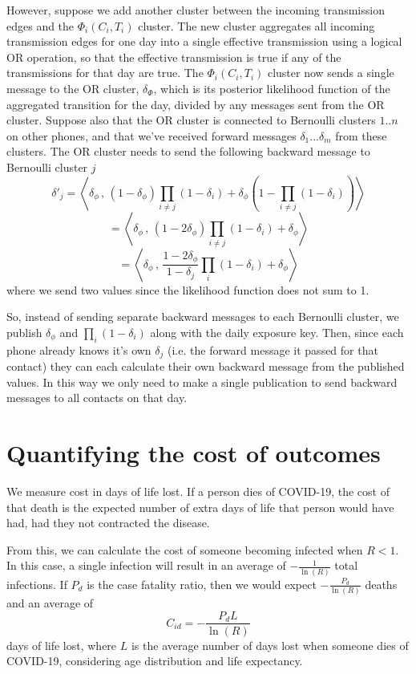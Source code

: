 \documentclass{article}
\begin{document}
However, suppose we add another cluster between the incoming transmission edges and the $\Phi_i(C_i,T_i)$ cluster. The new cluster aggregates all incoming transmission edges for one day into a single effective transmission using a logical OR operation, so that the effective transmission is true if any of the transmissions for that day are true. The $\Phi_i(C_i,T_i)$ cluster now sends a single message to the OR cluster, $\delta_\Phi$, which is its posterior likelihood function of the aggregated transition for the day, divided by any messages sent from the OR cluster. Suppose also that the OR cluster is connected to Bernoulli clusters $1..n$ on other phones, and that we've received forward messages $\delta_1...\delta_m$ from these clusters. The OR cluster needs to send the following backward message to Bernoulli cluster $j$
\[
\delta'_j = \left<\delta_\phi\,,\, (1-\delta_\phi)\prod_{i\ne j}(1-\delta_i) + \delta_\phi(1 - \prod_{i\ne j}(1-\delta_i))\right>
\]
\[
= \left<\delta_\phi\,,\, (1-2\delta_\phi)\prod_{i\ne j}(1-\delta_i) + \delta_\phi \right>
\]
\[
= \left<\delta_\phi\,,\, \frac{1-2\delta_\phi}{1-\delta_j}\prod_{i}(1-\delta_i) + \delta_\phi \right>
\]
where we send two values since the likelihood function does not sum to 1.

So, instead of sending separate backward messages to each Bernoulli cluster, we publish $\delta_\phi$ and $\prod_i (1-\delta_i)$ along with the daily exposure key. Then, since each phone already knows it's own $\delta_j$ (i.e. the forward message it passed for that contact) they can each calculate their own backward message from the published values. In this way we only need to make a single publication to send backward messages to all contacts on that day.

\section{Quantifying the cost of outcomes}

We measure cost in days of life lost. If a person dies of COVID-19, the cost of that death is the expected number of extra days of life that person would have had, had they not contracted the disease.

From this, we can calculate the cost of someone becoming infected when $R<1$. In this case, a single infection will result in an average of $-\frac{1}{\ln(R)}$ total infections. If $P_d$ is the case fatality ratio, then we would expect $-\frac{P_d}{\ln(R)}$ deaths and an average of
\[
C_{id} = -\frac{P_dL}{\ln(R)}
\]
days of life lost, where $L$ is the average number of days lost when someone dies of COVID-19, considering age distribution and life expectancy.
\end{document}
